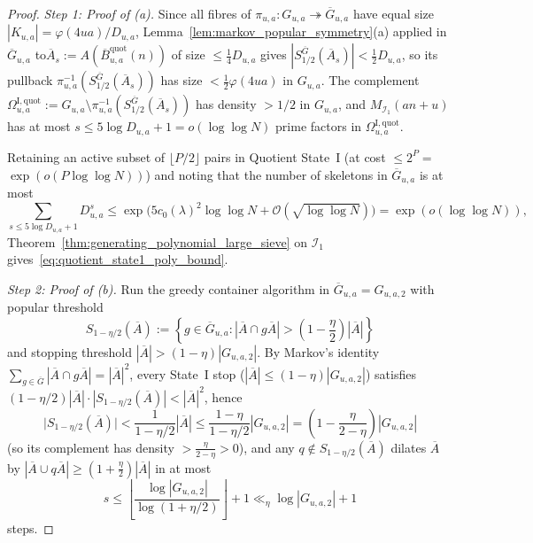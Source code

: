 \documentclass[11pt, a4paper]{article}
\theoremstyle{plain}
\theoremstyle{definition}
\begin{document}
\begin{proof}
\emph{Step 1: Proof of (a).}
Since all fibres of $\pi_{u,a}:G_{u,a}\twoheadrightarrow\overline{G}_{u,a}$ have equal size $|K_{u,a}|=\varphi(4ua)/D_{u,a}$, Lemma~\ref{lem:markov_popular_symmetry}(a) applied in $\overline{G}_{u,a}$ to\linebreak $\overline{A}_s:=A(\overline{B}_{u,a}^{\mathrm{quot}}(n))$ of size $\le\frac14 D_{u,a}$ gives $|S_{1/2}^{\overline{G}}(\overline{A}_s)|<\frac12 D_{u,a}$, so its pullback $\pi_{u,a}^{-1}(S_{1/2}^{\overline{G}}(\overline{A}_s))$ has size $<\frac12\varphi(4ua)$ in $G_{u,a}$. The complement $\Omega_{u,a}^{\mathrm{I,quot}}:=\allowbreak G_{u,a}\setminus\allowbreak\pi_{u,a}^{-1}(S_{1/2}^{\overline{G}}(\overline{A}_s))$ has density $>1/2$ in $G_{u,a}$, and $M_{\mathcal{I}_1}(an+u)$ has at most $s\le 5\log D_{u,a}+1=o(\log\log N)$ prime factors in $\Omega_{u,a}^{\mathrm{I,quot}}$. 

Retaining an active subset of $\lfloor P/2\rfloor$ pairs in Quotient State~I (at cost $\le 2^{P}=$\linebreak $\exp(o(P\log\log N))$) and noting that the number of skeletons in $\overline{G}_{u,a}$ is at most 
\[
\sum_{s\le 5\log D_{u,a}+1}D_{u,a}^{s}\le\exp\Big(5c_0(\lambda)^{2}\log\log N+\mathcal{O}(\sqrt{\log\log N})\Big)=\exp(o(\log\log N)),
\]
Theorem~\ref{thm:generating_polynomial_large_sieve} on $\mathcal{I}_1$ gives~\eqref{eq:quotient_state1_poly_bound}.

\medskip\noindent\emph{Step 2: Proof of (b).}
Run the greedy container algorithm in $\overline{G}_{u,a}=G_{u,a,2}$ with popular threshold 
\[
S_{1-\eta/2}(\overline{A}):=\left\{g\in\overline{G}_{u,a}:|\overline{A}\cap g\overline{A}|>\left(1-\frac{\eta}{2}\right)|\overline{A}|\right\}
\]
and stopping threshold $|\overline{A}|>(1-\eta)|G_{u,a,2}|$. By Markov's identity $\sum_{g\in\overline{G}}|\overline{A}\cap g\overline{A}|=|\overline{A}|^{2}$, every State~I stop ($|\overline{A}|\le(1-\eta)|G_{u,a,2}|$) satisfies $(1-\eta/2)|\overline{A}|\cdot|S_{1-\eta/2}(\overline{A})|<|\overline{A}|^{2}$, hence 
\[
\big|S_{1-\eta/2}(\overline{A})\big|<\frac{1}{1-\eta/2}|\overline{A}|\le\frac{1-\eta}{1-\eta/2}|G_{u,a,2}|=\left(1-\frac{\eta}{2-\eta}\right)|G_{u,a,2}|
\]
(so its complement has density $>\frac{\eta}{2-\eta}>0$), and any $q\notin S_{1-\eta/2}(\overline{A})$ dilates $\overline{A}$ by $|\overline{A}\cup q\overline{A}|\ge(1+\frac{\eta}{2})|\overline{A}|$ in at most 
\[
s\le\left\lfloor\frac{\log|G_{u,a,2}|}{\log(1+\eta/2)}\right\rfloor+1\ll_\eta\log|G_{u,a,2}|+1
\]
steps. 


\end{proof}
\end{document}
